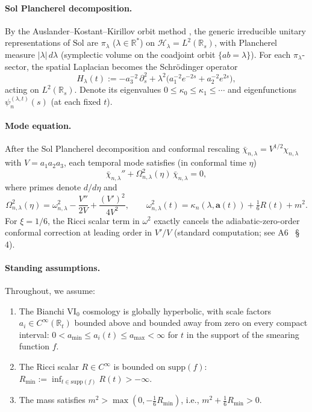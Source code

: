 \documentclass[11pt,a4paper]{article}
\theoremstyle{definition}
\newcommand{\Sol}{\mathrm{Sol}}
\newcommand{\R}{\mathbb{R}}
\newcommand{\Lp}{L^2}
\newcommand{\cH}{\mathcal{H}}
\begin{document}
\paragraph{Sol Plancherel decomposition.}
By the Auslander--Kostant--Kirillov orbit method \cite{AK71,Kir04}, the generic
irreducible unitary representations of $\Sol$ are $\pi_\lambda$ ($\lambda \in \R^*$)
on $\cH_\lambda = \Lp(\R_s)$, with Plancherel measure $|\lambda|\,d\lambda$
(symplectic volume on the coadjoint orbit $\{ab = \lambda\}$).
For each $\pi_\lambda$-sector, the spatial Laplacian becomes the Schr\"odinger operator
\begin{equation}\label{eq:spatialop}
  H_\lambda(t) := -a_3^{-2}\,\partial_s^2
                  + \lambda^2\bigl(a_1^{-2} e^{-2s} + a_2^{-2} e^{2s}\bigr),
\end{equation}
acting on $\Lp(\R_s)$.  Denote its eigenvalues $0 \leq \kappa_0 \leq \kappa_1 \leq \cdots$
and eigenfunctions $\psi_n^{(\lambda,t)}(s)$ (at each fixed $t$).

\paragraph{Mode equation.}
After the Sol Plancherel decomposition and conformal rescaling
$\bar\chi_{n,\lambda} = V^{1/2}\chi_{n,\lambda}$ with $V = a_1 a_2 a_3$,
each temporal mode satisfies (in conformal time $\eta$)
\begin{equation}\label{eq:modeconf}
  \bar\chi_{n,\lambda}'' + \Omega_{n,\lambda}^2(\eta)\,\bar\chi_{n,\lambda} = 0,
\end{equation}
where primes denote $d/d\eta$ and
\begin{equation}\label{eq:Omega2}
  \Omega_{n,\lambda}^2(\eta)
    = \omega_{n,\lambda}^2 - \frac{V''}{2V} + \frac{(V')^2}{4V^2},
  \qquad
  \omega_{n,\lambda}^2(t) = \kappa_n(\lambda, \mathbf{a}(t)) + \tfrac{1}{6}R(t) + m^2.
\end{equation}
For $\xi = 1/6$, the Ricci scalar term in $\omega^2$ exactly cancels the
adiabatic-zero-order conformal correction at leading order in $V'/V$
(standard computation; see A6~\cite{A6draft} §\,4).

\paragraph{Standing assumptions.}
Throughout, we assume:
\begin{enumerate}[label=(A\arabic*)]
  \item\label{A1} The Bianchi $\mathrm{VI_0}$ cosmology is globally hyperbolic, with
        scale factors $a_i \in C^\infty(\R_t)$ bounded above and bounded away from zero on
        every compact interval: $0 < a_{\min} \leq a_i(t) \leq a_{\max} < \infty$
        for $t$ in the support of the smearing function $f$.
  \item\label{A2} The Ricci scalar $R \in C^\infty$ is bounded on $\mathrm{supp}(f)$:
        $R_{\min} := \inf_{t\in\mathrm{supp}(f)} R(t) > -\infty$.
  \item\label{A3} The mass satisfies $m^2 > \max(0, -\tfrac{1}{6}R_{\min})$, i.e.,
        $m^2 + \tfrac{1}{6}R_{\min} > 0$.
\end{enumerate}
\end{document}
